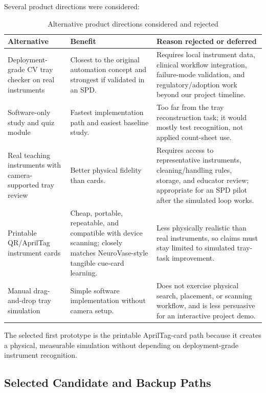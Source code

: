 \documentclass[10pt,a4paper]{article}
\begin{document}
Several product directions were considered:
\begin{table}[H]
\centering
\caption{Alternative product directions considered and rejected}
\label{tab:alternative-product-directions-considered-and-rejected}
\small\renewcommand{\arraystretch}{1.2}\setlength{\tabcolsep}{4pt}
\begin{tabularx}{\textwidth}{|>{\raggedright\arraybackslash}X|>{\raggedright\arraybackslash}X|>{\raggedright\arraybackslash}X|}
\hline
Alternative & Benefit & Reason rejected or deferred \\
\hline
Deployment-grade CV tray checker on real instruments & Closest to the original automation concept and strongest if validated in an SPD. & Requires local instrument data, clinical workflow integration, failure-mode validation, and regulatory/adoption work beyond our project timeline. \\
\hline
Software-only study and quiz module & Fastest implementation path and easiest baseline study. & Too far from the tray reconstruction task; it would mostly test recognition, not applied count-sheet use. \\
\hline
Real teaching instruments with camera-supported tray review & Better physical fidelity than cards. & Requires access to representative instruments, cleaning/handling rules, storage, and educator review; appropriate for an SPD pilot after the simulated loop works. \\
\hline
Printable QR/AprilTag instrument cards & Cheap, portable, repeatable, and compatible with device scanning; closely matches NeuroVase-style tangible cue-card learning. & Less physically realistic than real instruments, so claims must stay limited to simulated tray-task improvement. \\
\hline
Manual drag-and-drop tray simulation & Simple software implementation without camera setup. & Does not exercise physical search, placement, or scanning workflow, and is less persuasive for an interactive project demo. \\
\hline
\end{tabularx}
\end{table}
The selected first prototype is the printable AprilTag-card path because it
creates a physical, measurable simulation without depending on deployment-grade
instrument recognition.
\subsection{Selected Candidate and Backup Paths}
\end{document}
